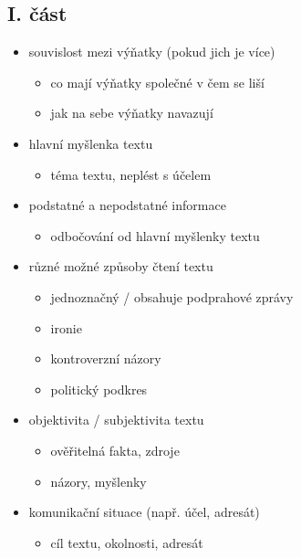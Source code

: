 \subsection{I. část}
\begin{itemize}
\item souvislost mezi výňatky (pokud jich je více)
	\begin{itemize}
	\item co mají výňatky společné v čem se liší
	\item jak na sebe výňatky navazují
	\end{itemize}
\item hlavní myšlenka textu
	\begin{itemize}
	\item téma textu, neplést s účelem
	\end{itemize}
\item podstatné a nepodstatné informace
	\begin{itemize}
	\item odbočování od hlavní myšlenky textu
	\end{itemize}
\item různé možné způsoby čtení textu
	\begin{itemize}
	\item jednoznačný / obsahuje podprahové zprávy
	\item ironie
	\item kontroverzní názory
	\item politický podkres
	\end{itemize}
\item objektivita / subjektivita textu
	\begin{itemize}
	\item ověřitelná fakta, zdroje
	\item názory, myšlenky
	\end{itemize}
\item komunikační situace (např. účel, adresát)
	\begin{itemize}
	\item cíl textu, okolnosti, adresát
	\end{itemize}
\end{itemize}

